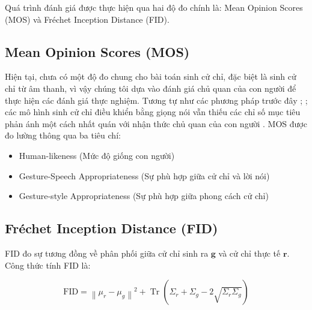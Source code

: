 Quá trình đánh giá được thực hiện qua hai độ đo chính là: Mean Opinion Scores (MOS) và Fréchet Inception Distance (FID).

\subsection{Mean Opinion Scores (MOS)}

Hiện tại, chưa có một độ đo chung cho bài toán sinh cử chỉ, đặc biệt là sinh cử chỉ từ âm thanh, vì vậy chúng tôi dựa vào đánh giá chủ quan của con người để thực hiện các đánh giá thực nghiệm. 
Tương tự như các phương pháp trước đây \cite{yoon2022genea}; \cite{kucherenko2021large}; các mô hình sinh cử chỉ điều khiển bằng giọng nói vẫn thiếu các chỉ số mục tiêu phản ánh một cách nhất quán với nhận thức chủ quan của con người  \cite{alexanderson2022listen}.
MOS được đo lường thông qua ba tiêu chí:

\begin{itemize}
	\item Human-likeness (Mức độ giống con người)
	\item Gesture-Speech Appropriateness (Sự phù hợp giữa cử chỉ và lời nói)
	\item Gesture-style Appropriateness (Sự phù hợp giữa phong cách cử chỉ)
\end{itemize}


\subsection{Fréchet Inception Distance (FID)}
FID đo sự tương đồng về phân phối giữa cử chỉ sinh ra $\mathbf{g}$ và cử chỉ thực tế $\mathbf{r}$. Công thức tính FID là:

\begin{equation}
	\text{FID} = \left\| \mu_r - \mu_g \right\|^2 + \operatorname{Tr}\left( \Sigma_r + \Sigma_g - 2 \sqrt{\Sigma_r \Sigma_g} \right)
\end{equation}



